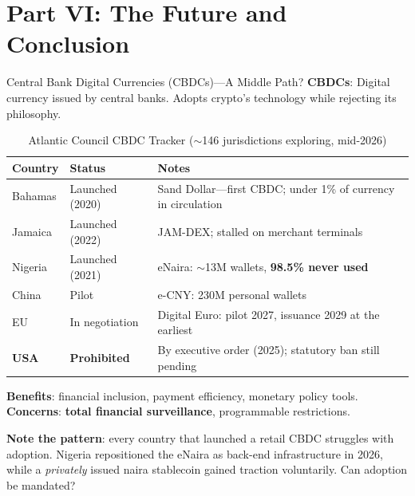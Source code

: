 ﻿\documentclass[aspectratio=169,11pt]{beamer}
\begin{document}
\section{Part VI: The Future and Conclusion}

\begin{frame}[shrink=8]{Central Bank Digital Currencies (CBDCs)---A Middle Path?}
\textbf{CBDCs}: Digital currency issued by central banks. Adopts crypto's technology while rejecting its philosophy.

\begin{table}[h]
\centering
\scriptsize
\begin{tabular}{@{}llp{5.4cm}@{}}
\toprule
\textbf{Country} & \textbf{Status} & \textbf{Notes} \\
\midrule
Bahamas & Launched (2020) & Sand Dollar---first CBDC; under 1\% of currency in circulation \\
Jamaica & Launched (2022) & JAM-DEX; stalled on merchant terminals \\
Nigeria & Launched (2021) & eNaira: $\sim$13M wallets, \textbf{98.5\% never used} \\
China & Pilot & e-CNY: 230M personal wallets \\
EU & In negotiation & Digital Euro: pilot 2027, issuance 2029 at the earliest \\
\textbf{USA} & \textbf{Prohibited} & By executive order (2025); statutory ban still pending \\
\bottomrule
\end{tabular}
\caption{\scriptsize Atlantic Council CBDC Tracker ($\sim$146 jurisdictions exploring, mid-2026)}
\end{table}

{\scriptsize \textbf{Benefits}: financial inclusion, payment efficiency, monetary policy tools. \textbf{Concerns}: \textbf{total financial surveillance}, programmable restrictions.

\textbf{Note the pattern}: every country that launched a retail CBDC struggles with adoption. Nigeria repositioned the eNaira as back-end infrastructure in 2026, while a \emph{privately} issued naira stablecoin gained traction voluntarily. Can adoption be mandated?}
\end{frame}
\end{document}
